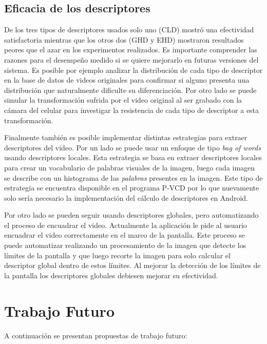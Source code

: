 \subsection*{Eficacia de los descriptores}
De los tres tipos de descriptores usados solo uno (CLD) mostró una efectividad satisfactoria mientras que los otros dos (GHD y EHD) mostraron resultados peores que el azar en los experimentos realizados. Es importante comprender las razones para el desempeño medido si se quiere mejorarlo en futuras versiones del sistema. Es posible por ejemplo analizar la distribución de cada tipo de descriptor en la base de datos de videos originales para confirmar si alguno presenta una distribución que naturalmente dificulte su diferenciación. Por otro lado se puede simular la transformación sufrida por el video original al ser grabado con la cámara del celular para investigar la resistencia de cada tipo de descriptor a esta transformación.

Finalmente también es posible implementar distintas estrategias para extraer descriptores del video. Por un lado se puede usar un enfoque de tipo \emph{bag of words} usando descriptores locales. Esta estrategia se basa en extraer descriptores locales para crear un vocabulario de palabras visuales de la imagen, luego cada imagen se describe con un histograma de las \emph{palabras} presentes en la imagen. Este tipo de estrategia se encuentra disponible en el programa P-VCD por lo que nuevamente solo sería necesario la implementación del cálculo de descriptores en Android.

Por otro lado se pueden seguir usando descriptores globales, pero automatizando el proceso de encuadrar el video. Actualmente la aplicación le pide al usuario encuadrar el video correctamente en el marco de la pantalla. Este proceso se puede automatizar realizando un procesamiento de la imagen que detecte los límites de la pantalla y que luego recorte la imagen para solo calcular el descriptor global dentro de estos límites. Al mejorar la detección de los límites de la pantalla los descriptores globales debiesen mejorar su efectividad.

\section{Trabajo Futuro}\label{futuro}

A continuación se presentan propuestas de trabajo futuro:

